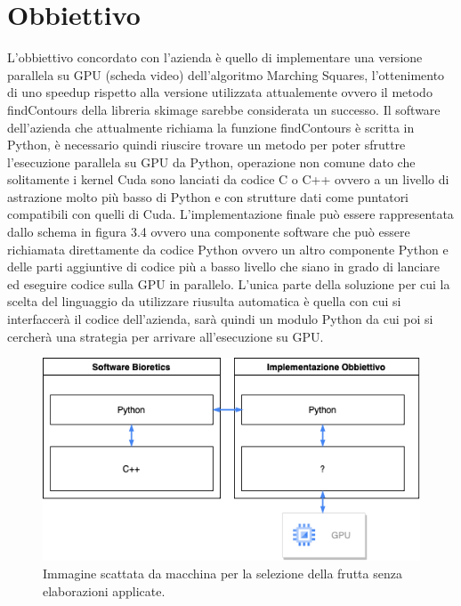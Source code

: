 \documentclass[12pt,a4paper]{report}
\begin{document}
\section{Obbiettivo}
L'obbiettivo concordato con l'azienda è quello di implementare una versione parallela su GPU (scheda video) dell'algoritmo Marching Squares, l'ottenimento di uno speedup rispetto alla versione utilizzata attualemente ovvero il metodo findContours della libreria skimage sarebbe considerata un successo. \newline
Il software dell'azienda che attualmente richiama la funzione findContours è scritta in Python, è necessario quindi riuscire trovare un metodo per poter sfruttre l'esecuzione parallela su GPU da Python, operazione non comune dato che solitamente i kernel Cuda sono lanciati da codice C o C++ ovvero a un livello di astrazione molto più basso di Python e con strutture dati come puntatori compatibili con quelli di Cuda. \newline
L'implementazione finale può essere rappresentata dallo schema in figura 3.4 ovvero una componente software che può essere richiamata direttamente da codice Python ovvero un altro componente Python e delle parti aggiuntive di codice più a basso livello che siano in grado di lanciare ed eseguire codice sulla GPU in parallelo. L'unica parte della soluzione per cui la scelta del linguaggio da utilizzare riusulta automatica è quella con cui si interfaccerà il codice dell'azienda, sarà quindi un modulo Python da cui poi si cercherà una strategia per arrivare all'esecuzione su GPU.

\begin{figure}[H]
    \centering
    \includegraphics[scale=0.8]{img/Diagram_Python_GPU.drawio.png}
    \caption{Immagine scattata da macchina per la selezione della frutta senza elaborazioni applicate.}
\end{figure}
\end{document}
